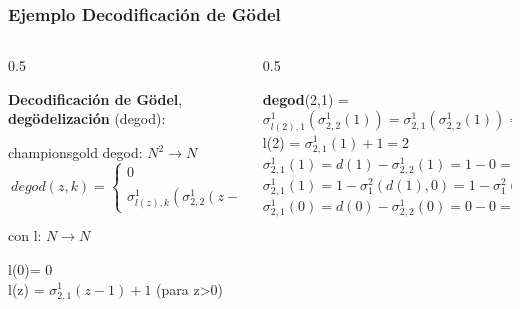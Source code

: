 \documentclass[xcolor=table]{beamer}
\begin{document}
\begin{frame}[fragile]\frametitle{Ejemplo Decodificación de Gödel} \scriptsize


\begin{columns}

    \begin{column}{0.5\textwidth}
  

      \textbf{Decodificación de Gödel},  \textbf{degödelización} (degod):

       \begin{colorblock}[black]{championsgold}{}\scriptsize
        degod: $N^2 \rightarrow N$
          \[\  degod(z,k) = \left\{ 
          \begin{array}{ll} 
              0 & si\; z=0 \lor k>l(z)\\ 
              \sigma^1_{l(z),k}( \sigma^1_{2,2}(z-1))  & resto 
          \end{array} \right. \]


          con  l: $N \rightarrow N$

         \hspace{0.5cm}  l(0)= 0\\
         \hspace{0.5cm}  l(z) = $\sigma^1_{2,1}(z-1)+1 $ (para z>0)
        \end{colorblock}

    \end{column}

    \begin{column}{0.5\textwidth}

    \textbf{degod}(2,1) = $\sigma^1_{l(2),1}( \sigma^1_{2,2}(1)) = \sigma^1_{2,1}( \sigma^1_{2,2}(1)) = \sigma^1_{2,1}(0)=0 $\\
\vspace{0.5cm} 
    l(2) = $\sigma^1_{2,1} (1) + 1 =2$\\
\vspace{0.2cm} 
    $\sigma^1_{2,1} (1) = d(1) - \sigma^1_{2,2}  (1) = 1 - 0 = 1$\\
\vspace{0.2cm}     
    $\sigma^1_{2,1} (1) = 1 - \sigma^2_{1} (d(1),0) =  1 - \sigma^2_{1} (1,0) = 1-1 = 0 $\\
 \vspace{0.2cm}    
    $\sigma^1_{2,1} (0) = d(0) - \sigma^1_{2,2}  (0) = 0 - 0 = 0$\\
        
    \end{column}
    
\end{columns}


\end{frame}
\end{document}
